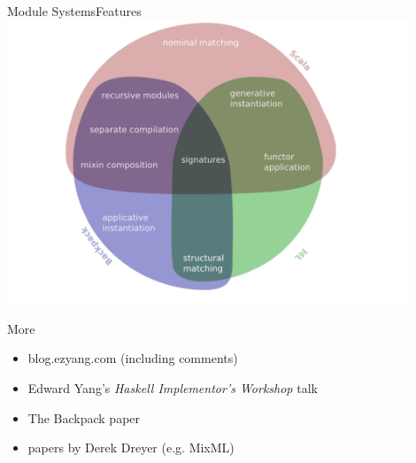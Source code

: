 \documentclass{beamer}
\begin{document}
\begin{frame}[fragile]{Module Systems}{Features}
\includegraphics[width=12cm]{features.pdf}
\end{frame}

\begin{frame}[fragile]{More}
\begin{itemize}
\item blog.ezyang.com (including comments)
\item Edward Yang's \textit{Haskell Implementor's Workshop} talk
\item The Backpack paper
\item papers by Derek Dreyer (e.g. MixML)
\end{itemize}
\end{frame}
\end{document}
